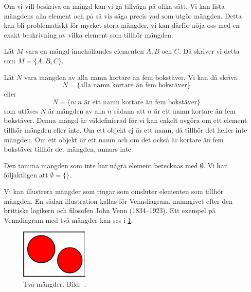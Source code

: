 Om vi vill beskriva en mängd kan vi gå tillväga på olika sätt.
Vi kan lista mängdens alla element och på så vis säga precis vad som utgör
mängden.
Detta kan bli problematiskt för mycket stora mängder, vi kan därför nöja oss
med en exakt beskrivning av vilka element som tillhör mängden.
\begin{example}\label{ExEnkelMangd}
  Låt \(M\) vara en mängd innehållandes elementen \(A,B\) och \(C\).
  Då skriver vi detta som \(M=\{A,B,C\}\).
\end{example}
\begin{example}
  Låt \(N\) vara mängden av alla namn kortare än fem bokstäver.
  Vi kan då skriva \[N=\{\text{alla namn kortare än fem bokstäver}\}\] eller
  \[N=\{n\colon n\text{ är ett namn kortare än fem bokstäver}\}\] som utläses
  \(N\) är mängden av alla \(n\) sådana att \(n\) är ett namn kortare än fem
  bokstäver.
  Denna mängd är väldefinierad för vi kan enkelt avgöra om ett element
  tillhör mängden eller inte.
  Om ett objekt ej är ett namn, då tillhör det heller inte mängden.
  Om ett objekt är ett namn och om det också är kortare än fem bokstäver
  tillhör det mängden, annars inte.
\end{example}
\begin{example}\label{ExTommaMangden}
  Den tomma mängden som inte har några element betecknas med \(\emptyset\).
  Vi har följaktligen att \(\emptyset=\{\}\).
\end{example}

Vi kan illustrera mängder som ringar som omsluter elementen som tillhör
mängden.
En sådan illustration kallas för Venndiagram, namngivet efter den brittiske 
logikern och filosofen John Venn (1834--1923).
Ett exempel på Venndiagram med två mängder kan ses i \cref{fig:Disjunkt}.
\begin{figure}
  \includegraphics[width=0.3\textwidth]{figs/disjoint.pdf}
  \caption{%
    Två mängder.
    Bild:~\cite{Wikipedia2013Set}.
  }\label{fig:Disjunkt}
\end{figure}

